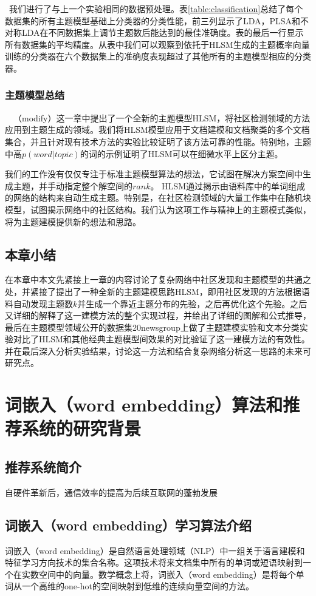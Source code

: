  我们进行了与上一个实验相同的数据预处理。表\ref{table:classification}总结了每个数据集的所有主题模型基础上分类器的分类性能，前三列显示了LDA，PLSA和不对称LDA在不同数据集上调节主题数后能达到的最佳准确度。表的最后一行显示所有数据集的平均精度。从表中我们可以观察到依托于HLSM生成的主题概率向量训练的分类器在六个数据集上的准确度表现超过了其他所有的主题模型相应的分类器。
  \subsection{主题模型总结}
  （modify）这一章中提出了一个全新的主题模型HLSM，将社区检测领域的方法应用到主题生成的领域。我们将HLSM模型应用于文档建模和文档聚类的多个文档集合，并且针对现有技术方法的实验比较证明了该方法可靠的性能。特别地，主题中高$p(word|topic)$的词的示例证明了HLSM可以在细微水平上区分主题。

我们的工作没有仅仅专注于标准主题模型算法的想法，它试图在解决方案空间中生成主题，并手动指定整个解空间的$ rank $。 HLSM通过揭示由语料库中的单词组成的网络的结构来自动生成主题。特别是，在社区检测领域的大量工作集中在随机块模型，试图揭示网络中的社区结构。我们认为这项工作与精神上的主题模式类似，将为主题建模提供新的想法和思路。
\section{本章小结}
在本章中本文先紧接上一章的内容讨论了复杂网络中社区发现和主题模型的共通之处，并紧接了提出了一种全新的主题建模思路HLSM，即用社区发现的方法根据语料自动发现主题数$k$并生成一个靠近主题分布的先验，之后再优化这个先验。之后又详细的解释了这一建模方法的整个实现过程，并给出了详细的图解和公式推导，最后在主题模型领域公开的数据集20newsgroup上做了主题建模实验和文本分类实验对比了HLSM和其他经典主题模型间效果的对比验证了这一建模方法的有效性。并在最后深入分析实验结果，讨论这一方法和结合复杂网络分析这一思路的未来可研究点。
\chapter{词嵌入（word embedding）算法和推荐系统的研究背景}
\section{推荐系统简介}
自硬件革新后，通信效率的提高为后续互联网的蓬勃发展
\section{词嵌入（word embedding）学习算法介绍}
词嵌入（word embedding）是自然语言处理领域（NLP）中一组关于语言建模和特征学习方向技术的集合名称。这项技术将来文档集中所有的单词或短语映射到一个在实数空间中的向量。数学概念上将，词嵌入（word embedding）是将每个单词从一个高维的one-hot的空间映射到低维的连续向量空间的方法。

